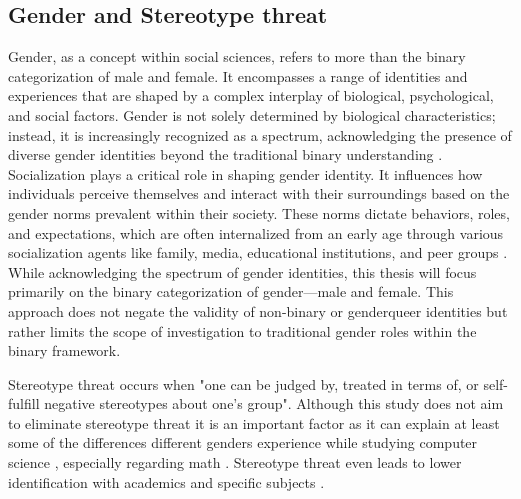 \subsection{Gender and Stereotype threat}
Gender, as a concept within social sciences, refers to more than the binary categorization of male and female.
It encompasses a range of identities and experiences that are shaped by a complex interplay of biological, psychological, and social factors.
Gender is not solely determined by biological characteristics; instead, it is increasingly recognized as a spectrum, acknowledging the presence of diverse gender identities beyond the traditional binary understanding \parencite{lindqvistWhatGenderAnyway2021}.
Socialization plays a critical role in shaping gender identity. It influences how individuals perceive themselves and interact with their surroundings based on the gender norms prevalent within their society.
These norms dictate behaviors, roles, and expectations, which are often internalized from an early age through various socialization agents like family, media, educational institutions, and peer groups \parencite{kampshoffHandbuchGeschlechterforschungUnd2012}.
While acknowledging the spectrum of gender identities, this thesis will focus primarily on the binary categorization of gender—male and female.
This approach does not negate the validity of non-binary or genderqueer identities but rather limits the scope of investigation to traditional gender roles within the binary framework.

Stereotype threat occurs when "one can be judged by, treated in terms of, or self-fulfill negative stereotypes about one's group".
Although this study does not aim to eliminate stereotype threat it is an important factor as it can explain at least some of the differences different genders experience while studying computer science \parencite{cheryanClassroomsMatterDesign2011}, especially regarding math \parencite{spencerStereotypeThreatWomen1999}.
Stereotype threat even leads to lower identification with academics and specific subjects \parencite{christyLeaderboardsVirtualClassroom2014}.